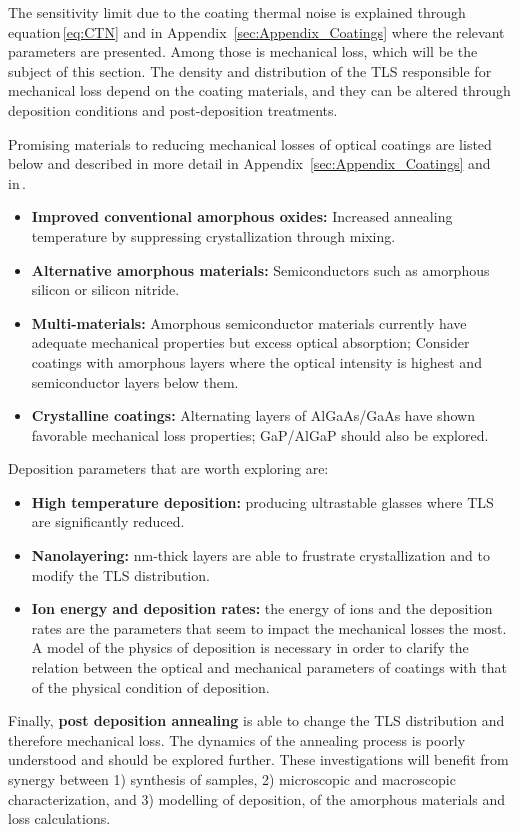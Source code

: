 The sensitivity limit due to the coating thermal noise is explained through equation\,\ref{eq:CTN} and in Appendix~\ref{sec:Appendix_Coatings} where the relevant parameters are presented. Among those is mechanical loss, which will be the subject of this section. The density and distribution of the \ac{TLS} responsible for mechanical loss depend on the coating materials, and they can be altered through deposition conditions and post-deposition treatments.

\noindent Promising materials to reducing mechanical losses of optical coatings are listed below and described in more detail in Appendix~\ref{sec:Appendix_Coatings} and in\,\cite{DawnIV2018}.
\begin{itemize}
    \item\textbf{Improved conventional amorphous oxides:} Increased annealing temperature by suppressing crystallization through mixing.
    \item\textbf{Alternative amorphous materials:} Semiconductors such as amorphous silicon or silicon nitride.
    \item\textbf{Multi-materials:} Amorphous semiconductor materials currently have adequate mechanical properties but excess optical absorption; Consider coatings with amorphous layers where the optical intensity is highest and semiconductor layers below them.
    \item\textbf{Crystalline coatings:} Alternating layers of \ac{AlGaAs/GaAs} have shown favorable mechanical loss properties; \ac{GaP/AlGaP} should also be explored.
\end{itemize}
Deposition parameters that are worth exploring are: 
\begin{itemize}
    \item\textbf{High temperature deposition:} producing ultrastable glasses where \ac{TLS} are significantly reduced.
    \item\textbf{Nanolayering:} nm-thick layers are able to frustrate crystallization and to modify the \ac{TLS} distribution.
    \item\textbf{Ion energy and deposition rates:} the energy of ions and the deposition rates are the parameters that seem to impact the mechanical losses the most. A model of the physics of deposition is necessary in order to clarify the relation between the optical and mechanical parameters of coatings with that of the physical condition of deposition.
\end{itemize}
Finally, \textbf{post deposition annealing} is able to change the \ac{TLS} distribution and therefore mechanical loss. The dynamics of the annealing process is poorly understood and should be explored further.
These investigations will benefit from synergy between 1) synthesis of samples, 2) microscopic and macroscopic characterization, and 3) modelling of deposition, of the amorphous materials and loss calculations.

